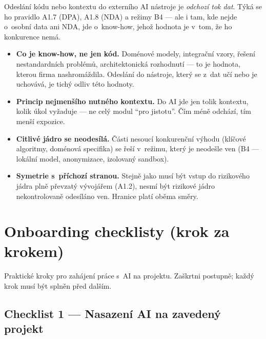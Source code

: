 \begin{calloutplain}[grey]
Odeslání kódu nebo kontextu do externího AI nástroje je \emph{odchozí tok dat}.
Týká se ho pravidlo A1.7 (DPA), A1.8 (NDA) a režimy B4 --- ale i tam, kde nejde o~osobní data ani NDA, jde o~know-how, jehož hodnota je v~tom, že ho konkurence nemá.
\end{calloutplain}

\medskip
\begin{itemize}
\item \textbf{Co je know-how, ne jen kód.}
Doménové modely, integrační vzory, řešení nestandardních problémů, architektonická rozhodnutí --- to je hodnota, kterou firma nashromáždila.
Odeslání do nástroje, který se z~dat učí nebo je uchovává, je tichý odliv této hodnoty.
\item \textbf{Princip nejmenšího nutného kontextu.}
Do AI jde jen tolik kontextu, kolik úkol vyžaduje --- ne celý modul \enquote{pro jistotu}.
Čím méně odchází, tím menší expozice.
\item \textbf{Citlivé jádro se neodesílá.}
Části nesoucí konkurenční výhodu (klíčové algoritmy, doménová specifika) se řeší v~režimu, který je neodešle ven (B4 --- lokální model, anonymizace, izolovaný sandbox).
\item \textbf{Symetrie s~příchozí stranou.}
Stejně jako musí být vstup do rizikového jádra plně převzatý vývojářem (A1.2), nesmí být rizikové jádro nekontrolovaně odesíláno ven.
Hranice platí oběma směry.
\end{itemize}

\section{Onboarding checklisty (krok za krokem)}

Praktické kroky pro zahájení práce s~AI na projektu.
Zaškrtni postupně; každý krok musí být splněn před dalším.

\subsection{Checklist 1 --- Nasazení AI na zavedený projekt}

